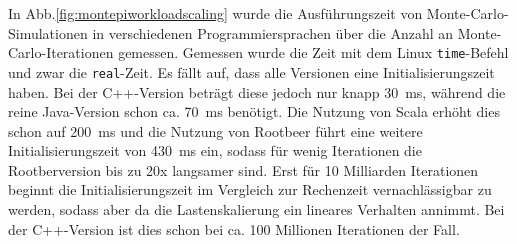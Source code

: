 In Abb.\ref{fig:montepiworkloadscaling} wurde die Ausführungszeit von Monte-Carlo-Simulationen in verschiedenen Programmiersprachen über die Anzahl an Monte-Carlo-Iterationen gemessen.
Gemessen wurde die Zeit mit dem Linux \texttt{time}-Befehl und zwar die \texttt{real}-Zeit.
Es fällt auf, dass alle Versionen eine Initialisierungszeit haben. Bei der C++-Version beträgt diese jedoch nur knapp \SI{30}{\milli\second}, während die reine Java-Version schon ca. \SI{70}{\milli\second} benötigt.
Die Nutzung von Scala erhöht dies schon auf \SI{200}{\milli\second} und die Nutzung von Rootbeer führt eine weitere Initialisierungszeit von \SI{430}{\milli\second} ein, sodass für wenig Iterationen die Rootberversion bis zu 20x langsamer sind.
Erst für 10 Milliarden Iterationen beginnt die Initialisierungszeit im Vergleich zur Rechenzeit vernachlässigbar zu werden, sodass aber da die Lastenskalierung ein lineares Verhalten annimmt.
Bei der C++-Version ist dies schon bei ca. 100 Millionen Iterationen der Fall.
